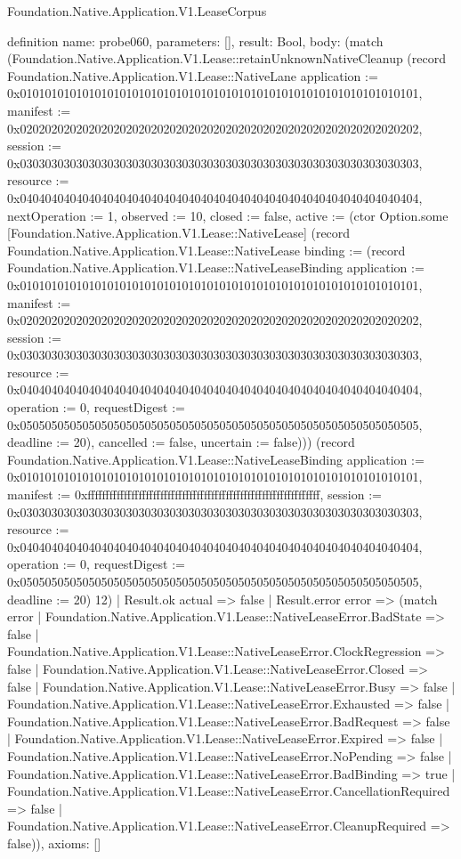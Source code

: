 \begin{lexlean}{Foundation.Native.Application.V1.LeaseCorpus}
\begin{semanticmodule}
definition{
  name: probe060,
  parameters: [],
  result: Bool,
  body: (match (Foundation.Native.Application.V1.Lease::retainUnknownNativeCleanup (record Foundation.Native.Application.V1.Lease::NativeLane {application := 0x0101010101010101010101010101010101010101010101010101010101010101, manifest := 0x0202020202020202020202020202020202020202020202020202020202020202, session := 0x0303030303030303030303030303030303030303030303030303030303030303, resource := 0x0404040404040404040404040404040404040404040404040404040404040404, nextOperation := 1, observed := 10, closed := false, active := (ctor Option.some [Foundation.Native.Application.V1.Lease::NativeLease] (record Foundation.Native.Application.V1.Lease::NativeLease {binding := (record Foundation.Native.Application.V1.Lease::NativeLeaseBinding {application := 0x0101010101010101010101010101010101010101010101010101010101010101, manifest := 0x0202020202020202020202020202020202020202020202020202020202020202, session := 0x0303030303030303030303030303030303030303030303030303030303030303, resource := 0x0404040404040404040404040404040404040404040404040404040404040404, operation := 0, requestDigest := 0x0505050505050505050505050505050505050505050505050505050505050505, deadline := 20}), cancelled := false, uncertain := false}))}) (record Foundation.Native.Application.V1.Lease::NativeLeaseBinding {application := 0x0101010101010101010101010101010101010101010101010101010101010101, manifest := 0xffffffffffffffffffffffffffffffffffffffffffffffffffffffffffffffff, session := 0x0303030303030303030303030303030303030303030303030303030303030303, resource := 0x0404040404040404040404040404040404040404040404040404040404040404, operation := 0, requestDigest := 0x0505050505050505050505050505050505050505050505050505050505050505, deadline := 20}) 12)
    | Result.ok actual => false
    | Result.error error => (match error
      | Foundation.Native.Application.V1.Lease::NativeLeaseError.BadState => false
      | Foundation.Native.Application.V1.Lease::NativeLeaseError.ClockRegression => false
      | Foundation.Native.Application.V1.Lease::NativeLeaseError.Closed => false
      | Foundation.Native.Application.V1.Lease::NativeLeaseError.Busy => false
      | Foundation.Native.Application.V1.Lease::NativeLeaseError.Exhausted => false
      | Foundation.Native.Application.V1.Lease::NativeLeaseError.BadRequest => false
      | Foundation.Native.Application.V1.Lease::NativeLeaseError.Expired => false
      | Foundation.Native.Application.V1.Lease::NativeLeaseError.NoPending => false
      | Foundation.Native.Application.V1.Lease::NativeLeaseError.BadBinding => true
      | Foundation.Native.Application.V1.Lease::NativeLeaseError.CancellationRequired => false
      | Foundation.Native.Application.V1.Lease::NativeLeaseError.CleanupRequired => false)),
  axioms: []
}


\end{semanticmodule}
\end{lexlean}
